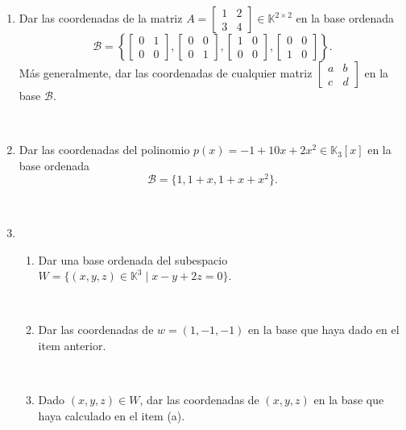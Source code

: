 \documentclass[12pt]{amsart}
\begin{document}
\begin{enumerate}
\item Dar las coordenadas de la matriz
$A=\left[\begin{array}{cc}
   1&2\\3&4
   \end{array}
   \right]\in \mathbb{K}^{2\times 2}
$ en la base ordenada
$$
\mathcal{B}=\left\{
\left[\begin{array}{cc}
   0&1\\0&0
   \end{array}
\right],
\left[\begin{array}{cc}
   0&0\\0&1
   \end{array}
   \right],
   \left[\begin{array}{cc}
   1&0\\0&0
   \end{array}
   \right],
   \left[\begin{array}{cc}
   0&0\\1&0
   \end{array}
   \right]
\right\}.
$$
M\'as generalmente, dar las coordenadas de cualquier matriz $\left[\begin{array}{cc}
   a&b\\c&d
   \end{array}
   \right]$ en la base $\mathcal{B}$.

\

\item Dar las coordenadas del polinomio $p(x) = -1+10x+2x^2\in\mathbb{K}_3[x]$ en la base ordenada $$\mathcal{B}=\{1,1+x,1+x+x^2\}.$$

\

\item
\begin{enumerate}
\item Dar una base ordenada del subespacio $W=\{(x,y,z)\in\mathbb{K}^3\mid x-y+2z=0\}$.

\

\item Dar las coordenadas de $w=(1,-1,-1)$ en la base que haya dado en el item anterior.

\

\item Dado $(x,y,z)\in W$, dar las coordenadas de $(x,y,z)$ en la base que haya calculado en el item (a).
\end{enumerate}

\


\end{enumerate}
\end{document}
